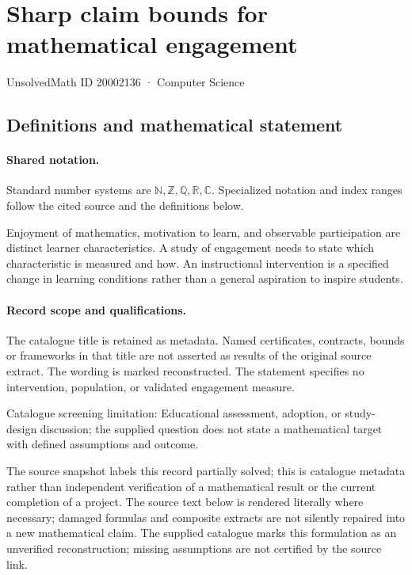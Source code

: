 \documentclass[11pt]{article}
\begin{document}
\setcounter{section}{20002135}
\section{Sharp claim bounds for mathematical engagement}\label{20002136}
{\small\sffamily UnsolvedMath ID 20002136 · Computer Science}
\subsection{Definitions and mathematical statement}

\paragraph{Shared notation.}Standard number systems are $\mathbb N,\mathbb Z,\mathbb Q,\mathbb R,\mathbb C$. Specialized notation and index ranges follow the cited source and the definitions below.


Enjoyment of mathematics, motivation to learn, and observable participation are distinct learner characteristics. A study of engagement needs to state which characteristic is measured and how. An instructional intervention is a specified change in learning conditions rather than a general aspiration to inspire students.
\paragraph{Record scope and qualifications.}
The catalogue title is retained as metadata. Named certificates, contracts, bounds or frameworks in that title are not asserted as results of the original source extract.
The wording is marked reconstructed. The statement specifies no intervention, population, or validated engagement measure.

Catalogue screening limitation: Educational assessment, adoption, or study-design discussion; the supplied question does not state a mathematical target with defined assumptions and outcome.

The source snapshot labels this record partially solved; this is catalogue metadata rather than independent verification of a mathematical result or the current completion of a project.
The source text below is rendered literally where necessary; damaged formulas and composite extracts are not silently repaired into a new mathematical claim.
The supplied catalogue marks this formulation as an unverified reconstruction; missing assumptions are not certified by the source link.
\end{document}
